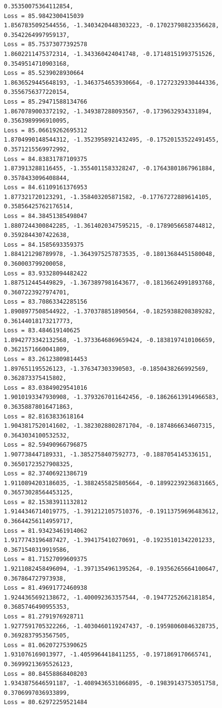 \documentclass[11pt]{article}
\begin{document}
\begin{Verbatim}[commandchars=\\\{\}]
0.35350075364112854,
Loss = 85.9842300415039
1.8567835092544556, -1.3403420448303223, -0.17023798823356628,
0.3542264997959137,
Loss = 85.75373077392578
1.8602211475372314, -1.343360424041748, -0.17148151993751526,
0.3549514710903168,
Loss = 85.5239028930664
1.8636529445648193, -1.3463754653930664, -0.17272329330444336,
0.3556756377220154,
Loss = 85.29471588134766
1.8670789003372192, -1.349387288093567, -0.1739632934331894, 0.3563989996910095,
Loss = 85.06619262695312
1.8704990148544312, -1.3523958921432495, -0.17520153522491455,
0.3571215569972992,
Loss = 84.83831787109375
1.873913288116455, -1.3554011583328247, -0.17643801867961884,
0.3578433096408844,
Loss = 84.61109161376953
1.877321720123291, -1.358403205871582, -0.17767272889614105,
0.35856425762176514,
Loss = 84.38451385498047
1.8807244300842285, -1.3614020347595215, -0.1789056658744812,
0.3592844307422638,
Loss = 84.1585693359375
1.884121298789978, -1.3643975257873535, -0.18013684451580048, 0.360003799200058,
Loss = 83.93328094482422
1.887512445449829, -1.3673897981643677, -0.18136624991893768,
0.3607223927974701,
Loss = 83.70863342285156
1.8908977508544922, -1.370378851890564, -0.18259388208389282,
0.36144018173217773,
Loss = 83.484619140625
1.8942773342132568, -1.3733646869659424, -0.1838197410106659,
0.3621571660041809,
Loss = 83.26123809814453
1.897651195526123, -1.376347303390503, -0.1850438266992569, 0.362873375415802,
Loss = 83.03849029541016
1.9010193347930908, -1.3793267011642456, -0.18626613914966583,
0.36358878016471863,
Loss = 82.8163833618164
1.9043817520141602, -1.3823028802871704, -0.1874866634607315,
0.3643034100532532,
Loss = 82.59490966796875
1.907738447189331, -1.3852758407592773, -0.1887054145336151,
0.36501723527908325,
Loss = 82.37406921386719
1.9110894203186035, -1.3882455825805664, -0.18992239236831665,
0.36573028564453125,
Loss = 82.15383911132812
1.9144346714019775, -1.3912121057510376, -0.19113759696483612,
0.36644256114959717,
Loss = 81.93423461914062
1.9177743196487427, -1.394175410270691, -0.19235101342201233,
0.3671540319919586,
Loss = 81.71527099609375
1.9211082458496094, -1.3971354961395264, -0.19356265664100647,
0.367864727973938,
Loss = 81.49691772460938
1.9244365692138672, -1.400092363357544, -0.19477252662181854,
0.3685746490955353,
Loss = 81.2791976928711
1.9277591705322266, -1.4030460119247437, -0.19598060846328735,
0.3692837953567505,
Loss = 81.06207275390625
1.931076169013977, -1.4059964418411255, -0.1971869170665741,
0.36999213695526123,
Loss = 80.84558868408203
1.9343875646591187, -1.4089436531066895, -0.19839143753051758,
0.3706997036933899,
Loss = 80.62972259521484

\end{Verbatim}
\end{document}
